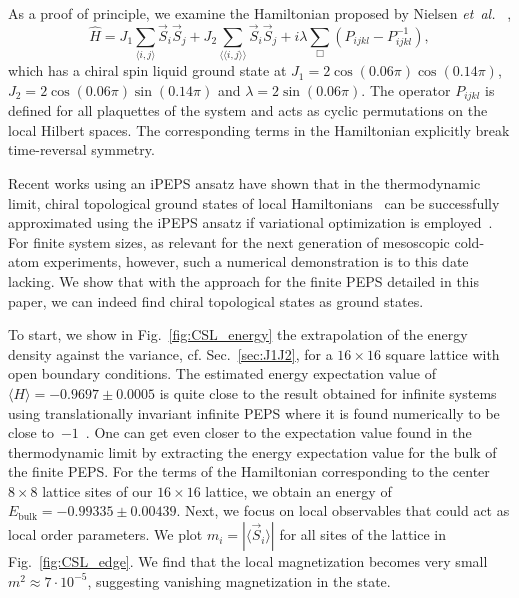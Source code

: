 \documentclass[aps,notitlepage,twocolumn,nofootinbib,superscriptaddress,pra,10pt]{revtex4-2}
\newcommand{\etal}{\textit{et~al.} }
\begin{document}
As a proof of principle, we examine the Hamiltonian proposed by Nielsen \etal~\cite{nielsen2013local_FQH}, 
\begin{equation}
    \hat{H} = J_1\sum_{\langle i,j \rangle} \vec{S}_i \vec{S}_j + J_2\sum_{\langle\langle i,j \rangle\rangle} \vec{S}_i \vec{S}_j + i\lambda \sum_{\Box} (P_{ijkl} - P^{-1}_{ijkl}),
    \label{eq:CSL_Model}
\end{equation}
which has a chiral spin liquid ground state at $J_1 =2\cos(0.06\pi)\cos(0.14\pi)$, $J_2 = 2\cos(0.06\pi)\sin(0.14\pi)$ and $\lambda = 2\sin(0.06\pi)$. The operator $P_{ijkl}$ is defined for all plaquettes of the system and acts as cyclic permutations on the local Hilbert spaces. The corresponding terms in the Hamiltonian explicitly break time-reversal symmetry. 

Recent works using an iPEPS ansatz have shown that in the thermodynamic limit, chiral topological ground states of local Hamiltonians~\cite{Hasik22_CSL, Weerda24_FQH} can be successfully approximated using the iPEPS ansatz if variational optimization is employed~\cite{Corboz16_variational,Vanderstraeten16_gradient,Liao19_AD_PEPS,Weerda24_variPEPS}. 
For finite system sizes, as relevant for the next generation of mesoscopic cold-atom experiments, however, such a numerical demonstration is to this date lacking.
We show that with the approach for the finite PEPS detailed in this paper, we can indeed find chiral topological states as ground states.

To start, we show in Fig.~\ref{fig:CSL_energy} the extrapolation of the energy density against the variance, cf. Sec.~\ref{sec:J1J2}, for a $16 \times 16$ square lattice with open boundary conditions. 
The estimated energy expectation value of $\langle H \rangle = -0.9697 \pm 0.0005$ is quite close to the result obtained for infinite systems using translationally invariant infinite PEPS where it is found numerically to be close to~$-1$~\cite{Hasik22_CSL}. One can get even closer to the expectation value found in the thermodynamic limit by extracting the energy expectation value for the bulk of the finite PEPS. For the terms of the Hamiltonian corresponding to the center $8 \times 8$ lattice sites of our $16 \times 16$ lattice, we obtain an energy of $E_{\text{bulk}} = -0.99335 \pm 0.00439$.
Next, we focus on local observables that could act as local order parameters. 
We plot $m_i = |\langle \vec{S}_i \rangle |$ for all sites of the lattice in Fig.~\ref{fig:CSL_edge}. 
We find that the local magnetization becomes very small $m^2 \approx 7\cdot 10^{-5}$, suggesting vanishing magnetization in the state.
\end{document}
